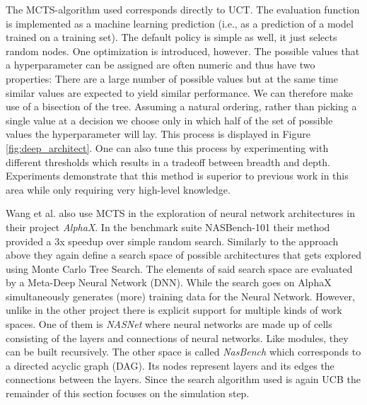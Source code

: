 The MCTS-algorithm used corresponds directly to UCT. The evaluation function is implemented as a machine learning prediction (i.e., as a prediction of a model trained on a training set). The default policy is simple as well, it just selects random nodes. One optimization is introduced, however. The possible values that a hyperparameter can be assigned are often numeric and thus have two properties: There are a large number of possible values but at the same time similar values are expected to yield similar performance. We can therefore make use of a bisection of the tree. Assuming a natural ordering, rather than picking a single value at a decision we choose only in which half of the set of possible values the hyperparameter will lay. This process is displayed in Figure \ref{fig:deep_architect}. One can also tune this process by experimenting with different thresholds which results in a tradeoff between breadth and depth. Experiments demonstrate that this method is superior to previous work in this area while only requiring very high-level knowledge.

Wang et al. \cite{wang2019alphax} also use MCTS in the exploration of neural network architectures in their project \textit{AlphaX}. In the benchmark suite NASBench-101 \cite{ying2019bench} their method provided a 3x speedup over simple random search. Similarly to the approach above they again define a search space of possible architectures that gets explored using Monte Carlo Tree Search. The elements of said search space are evaluated by a Meta-Deep Neural Network (DNN). While the search goes on AlphaX simultaneously generates (more) training data for the Neural Network. However, unlike in the other project there is explicit support for multiple kinds of work spaces. One of them is \textit{NASNet} where neural networks are made up of cells consisting of the layers and connections of neural networks. Like modules, they can be built recursively. The other space is called \textit{NasBench} which corresponds to a directed acyclic graph (DAG). Its nodes represent layers and its edges the connections between the layers. Since the search algorithm used is again UCB the remainder of this section focuses on the simulation step.

